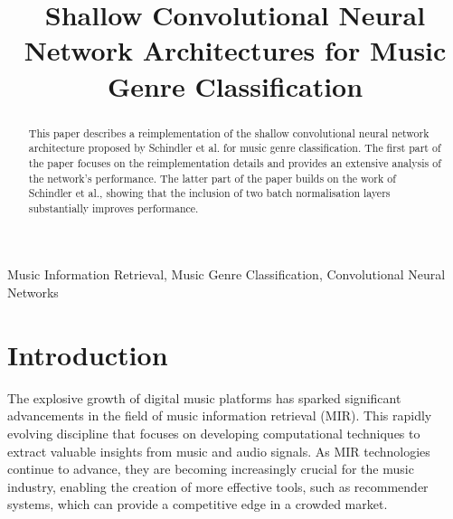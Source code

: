 \documentclass[conference]{IEEEtran}
\begin{document}

\title{Shallow Convolutional Neural Network Architectures for Music Genre Classification}

\author{
}

\maketitle

\begin{abstract}
This paper describes a reimplementation of the shallow convolutional neural network architecture proposed by Schindler et al. \cite{SchindlerLidyRauber} for music genre classification.
The first part of the paper focuses on the reimplementation details and provides an extensive analysis of the network's performance.
The latter part of the paper builds on the work of Schindler et al., showing that the inclusion of two batch normalisation layers substantially improves performance.
\end{abstract}

\begin{IEEEkeywords}
Music Information Retrieval, Music Genre Classification, Convolutional Neural Networks
\end{IEEEkeywords}

\section{Introduction}

The explosive growth of digital music platforms has sparked significant advancements in the field of music information retrieval (MIR).
This rapidly evolving discipline that focuses on developing computational techniques to extract valuable insights from music and audio signals.
As MIR technologies continue to advance, they are becoming increasingly crucial for the music industry, enabling the creation of more effective tools, such as recommender systems, which can provide a competitive edge in a crowded market.
\end{document}

